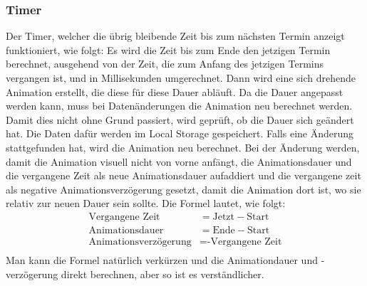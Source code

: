 \subsubsection{Timer}
Der Timer, welcher die übrig bleibende Zeit bis zum nächsten Termin anzeigt funktioniert, wie folgt:
\newline
\newline
Es wird die Zeit bis zum Ende den jetzigen Termin berechnet, ausgehend von der Zeit, die zum Anfang des jetzigen Termins vergangen ist, und in Millisekunden umgerechnet.
Dann wird eine sich drehende Animation erstellt, die diese für diese Dauer abläuft.
\newline
Da die Dauer angepasst werden kann, muss bei Datenänderungen die Animation neu berechnet werden.
Damit dies nicht ohne Grund passiert, wird geprüft, ob die Dauer sich geändert hat.
Die Daten dafür werden im Local Storage gespeichert.
Falls eine Änderung stattgefunden hat, wird die Animation neu berechnet.
Bei der Änderung werden, damit die Animation visuell nicht von vorne anfängt, die Animationsdauer und die vergangene Zeit als neue Animationsdauer aufaddiert und die vergangene zeit als negative Animationsverzögerung gesetzt, damit die Animation dort ist, wo sie relativ zur neuen Dauer sein sollte.
\newline
\newline
Die Formel lautet, wie folgt:
\newline
\newline
\begin{equation}
\begin{aligned}
    \text{Vergangene Zeit} &= \text{Jetzt} - \text{Start} \\
\text{Animationsdauer} &= \text{Ende} - \text{Start} \\
    \text {Animationsverzögerung} &= \text{-Vergangene Zeit} \\
\end{aligned}
\end{equation}
\newline
\newline
Man kann die Formel natürlich verkürzen und die Animationdauer und -verzögerung direkt berechnen, aber so ist es verständlicher.


